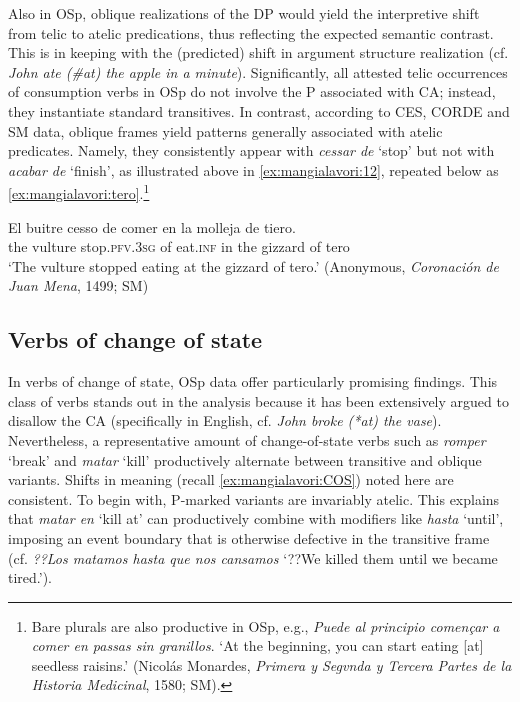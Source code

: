 \documentclass[output=paper,colorlinks,citecolor=brown,
]{langscibook}
\begin{document}
Also in OSp, oblique realizations of the DP would yield the interpretive shift from telic to atelic predications, thus reflecting the expected semantic contrast. This is in keeping with the (predicted) shift in argument structure realization (cf. \textit{John ate (\#at) the apple in a minute}). Significantly, all attested telic occurrences of consumption verbs in OSp do not involve the P associated with CA; instead, they instantiate standard transitives. In contrast, according to CES, CORDE and SM data, oblique frames yield patterns generally associated with atelic predicates. Namely, they consistently appear with \textit{cessar de} ‘stop’ but not with \textit{acabar de} ‘finish’, as illustrated above in  \ref{ex:mangialavori:12}, repeated below as  \ref{ex:mangialavori:tero}.\footnote{Bare plurals are also productive in OSp, e.g., \textit{Puede al principio començar a comer en passas sin granillos}. ‘At the beginning, you can start eating [at] seedless raisins.’ (Nicolás Monardes, \textit{Primera y Segvnda y Tercera Partes de la Historia Medicinal}, 1580; SM).} 

\ea\label{ex:mangialavori:tero}
    \gll El buitre cesso de comer en la molleja de tiero.\\
the vulture stop.\textsc{pfv}.\textsc{3sg} of eat.\textsc{inf} in the gizzard of tero\\
    \glt ‘The vulture stopped eating at the gizzard of tero.’ (Anonymous, \textit{Coronación de Juan Mena}, 1499; SM)
\z 


\subsection{Verbs of change of state}\label{sec:mangialavori:3-3}
In verbs of change of state, OSp data offer particularly promising findings. This class of verbs stands out in the analysis because it has been extensively argued to disallow the CA (specifically in English, cf. \textit{John broke (*at) the vase}). Nevertheless, a representative amount of change-of-state verbs such as \textit{romper} ‘break’ and \textit{matar} ‘kill’ productively alternate between transitive and oblique variants. Shifts in meaning (recall  \ref{ex:mangialavori:COS}) noted here are consistent. To begin with, P-marked variants are invariably atelic. This explains that \textit{matar en} ‘kill at’ can productively combine with modifiers like \textit{hasta} ‘until’, imposing an event boundary that is otherwise defective in the transitive frame (cf. \textit{??Los matamos hasta que nos cansamos} ‘??We killed them until we became tired.’). 
\end{document}
